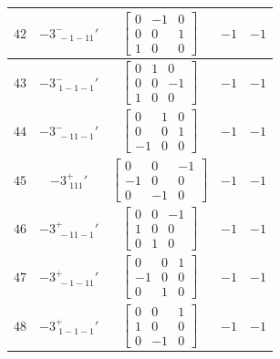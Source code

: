 \documentclass[fleqn,8pt]{jsarticle}
\begin{document}
\begin{longtable}{ccccc}
$ 42 $ & $ -3^{-}_{\,\,-1-11}{}' $ & $ \begin{bmatrix} 0 & -1 & 0 \\ 0 & 0 & 1 \\ 1 & 0 & 0 \end{bmatrix} $ & $ -1 $ & $ -1 $ \\ \hline
$ 43 $ & $ -3^{-}_{\,\,1-1-1}{}' $ & $ \begin{bmatrix} 0 & 1 & 0 \\ 0 & 0 & -1 \\ 1 & 0 & 0 \end{bmatrix} $ & $ -1 $ & $ -1 $ \\ \hline
$ 44 $ & $ -3^{-}_{\,\,-11-1}{}' $ & $ \begin{bmatrix} 0 & 1 & 0 \\ 0 & 0 & 1 \\ -1 & 0 & 0 \end{bmatrix} $ & $ -1 $ & $ -1 $ \\ \hline
$ 45 $ & $ -3^{+}_{\,\,111}{}' $ & $ \begin{bmatrix} 0 & 0 & -1 \\ -1 & 0 & 0 \\ 0 & -1 & 0 \end{bmatrix} $ & $ -1 $ & $ -1 $ \\ \hline
$ 46 $ & $ -3^{+}_{\,\,-11-1}{}' $ & $ \begin{bmatrix} 0 & 0 & -1 \\ 1 & 0 & 0 \\ 0 & 1 & 0 \end{bmatrix} $ & $ -1 $ & $ -1 $ \\ \hline
$ 47 $ & $ -3^{+}_{\,\,-1-11}{}' $ & $ \begin{bmatrix} 0 & 0 & 1 \\ -1 & 0 & 0 \\ 0 & 1 & 0 \end{bmatrix} $ & $ -1 $ & $ -1 $ \\ \hline
$ 48 $ & $ -3^{+}_{\,\,1-1-1}{}' $ & $ \begin{bmatrix} 0 & 0 & 1 \\ 1 & 0 & 0 \\ 0 & -1 & 0 \end{bmatrix} $ & $ -1 $ & $ -1 $ \\
\end{longtable}
\end{document}
